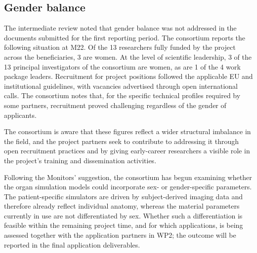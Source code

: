 \documentclass[a4paper,12pt, numbers]{article}
\begin{document}
\subsection{Gender balance}

The intermediate review noted that gender balance was not addressed in the documents
submitted for the first reporting period. The consortium reports the following situation at
M22. Of the 13 researchers fully funded by the project across the beneficiaries, 3 are
women. At the level of scientific leadership, 3 of the 13 principal investigators of the
consortium are women, as are 1 of the 4 work package leaders. Recruitment for project positions followed the applicable EU and institutional guidelines, with vacancies advertised through open international calls. The consortium notes that, for the specific technical profiles required by some partners, recruitment proved challenging regardless of the gender of applicants.

The consortium is aware that these figures reflect a wider structural imbalance in the
field, and the project partners seek to contribute to addressing it through open recruitment practices and by
giving early-career researchers a visible role in the project's training and dissemination
activities.

Following the Monitors' suggestion, the consortium has begun examining whether the organ
simulation models could incorporate sex- or gender-specific parameters. The patient-specific
simulators are driven by subject-derived imaging data and therefore already reflect
individual anatomy, whereas the material parameters currently in use are not differentiated
by sex. Whether such a differentiation is feasible within the remaining project time, and
for which applications, is being assessed together with the application partners in WP2;
the outcome will be reported in the final application deliverables.

\label{MyLastPage}
\end{document}
